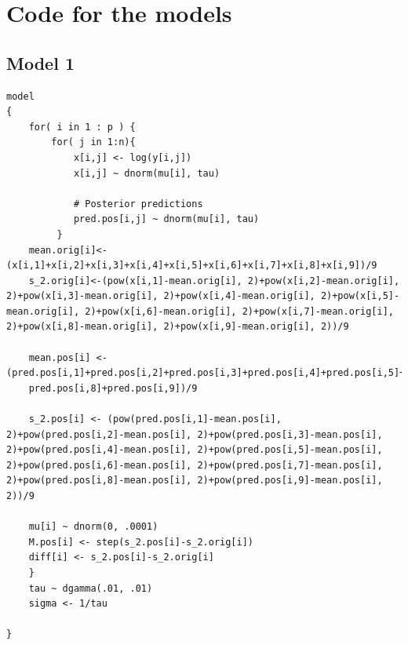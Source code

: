 \documentclass{article}
\begin{document}
\newpage
\section{Code for the models}

\subsection*{Model 1}
\begin{lstlisting}
model
{
	for( i in 1 : p ) {
		for( j in 1:n){
			x[i,j] <- log(y[i,j])
			x[i,j] ~ dnorm(mu[i], tau)
			
			# Posterior predictions
			pred.pos[i,j] ~ dnorm(mu[i], tau)
    	 }
	mean.orig[i]<- (x[i,1]+x[i,2]+x[i,3]+x[i,4]+x[i,5]+x[i,6]+x[i,7]+x[i,8]+x[i,9])/9
	s_2.orig[i]<-(pow(x[i,1]-mean.orig[i], 2)+pow(x[i,2]-mean.orig[i], 2)+pow(x[i,3]-mean.orig[i], 2)+pow(x[i,4]-mean.orig[i], 2)+pow(x[i,5]-mean.orig[i], 2)+pow(x[i,6]-mean.orig[i], 2)+pow(x[i,7]-mean.orig[i], 2)+pow(x[i,8]-mean.orig[i], 2)+pow(x[i,9]-mean.orig[i], 2))/9
	
	mean.pos[i] <- (pred.pos[i,1]+pred.pos[i,2]+pred.pos[i,3]+pred.pos[i,4]+pred.pos[i,5]+pred.pos[i,6]+pred.pos[i,7]+
	pred.pos[i,8]+pred.pos[i,9])/9
	
	s_2.pos[i] <- (pow(pred.pos[i,1]-mean.pos[i], 2)+pow(pred.pos[i,2]-mean.pos[i], 2)+pow(pred.pos[i,3]-mean.pos[i], 2)+pow(pred.pos[i,4]-mean.pos[i], 2)+pow(pred.pos[i,5]-mean.pos[i], 2)+pow(pred.pos[i,6]-mean.pos[i], 2)+pow(pred.pos[i,7]-mean.pos[i], 2)+pow(pred.pos[i,8]-mean.pos[i], 2)+pow(pred.pos[i,9]-mean.pos[i], 2))/9
	
	mu[i] ~ dnorm(0, .0001)
	M.pos[i] <- step(s_2.pos[i]-s_2.orig[i])
	diff[i] <- s_2.pos[i]-s_2.orig[i]
	}
	tau ~ dgamma(.01, .01)
	sigma <- 1/tau
	
}

\end{lstlisting}
\end{document}
